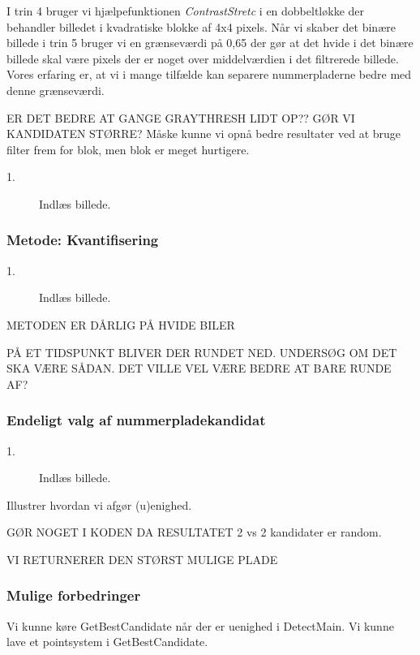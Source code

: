 I trin 4 bruger vi hjælpefunktionen \textit{ContrastStretc} i en dobbeltløkke der behandler billedet i kvadratiske blokke af 4x4 pixels. Når vi skaber det binære billede i trin 5 bruger vi en grænseværdi på 0,65 der gør at det hvide i det binære billede skal være pixels der er noget over middelværdien i det filtrerede billede. Vores erfaring er, at vi i mange tilfælde kan separere nummerpladerne bedre med denne grænseværdi.

ER DET BEDRE AT GANGE GRAYTHRESH LIDT OP??    
GØR VI KANDIDATEN STØRRE?
Måske kunne vi opnå bedre resultater ved at bruge filter frem for blok, men blok er meget hurtigere.

\begin{description}
\item[1.] Indlæs billede.
\end{description}


\subsubsection{Metode: Kvantifisering}
\begin{description}
\item[1.] Indlæs billede.
\end{description}

METODEN ER DÅRLIG PÅ HVIDE BILER

PÅ ET TIDSPUNKT BLIVER DER RUNDET NED. UNDERSØG OM DET SKA VÆRE SÅDAN. DET VILLE VEL VÆRE BEDRE AT BARE RUNDE AF?



\subsubsection{Endeligt valg af nummerpladekandidat}
\begin{description}
\item[1.] Indlæs billede.
\end{description}


Illustrer hvordan vi afgør (u)enighed. 

GØR NOGET I KODEN DA RESULTATET 2 vs 2 kandidater er random.

VI RETURNERER DEN STØRST MULIGE PLADE

\subsubsection{Mulige forbedringer}
Vi kunne køre GetBestCandidate når der er uenighed i DetectMain.
Vi kunne lave et pointsystem i GetBestCandidate.


